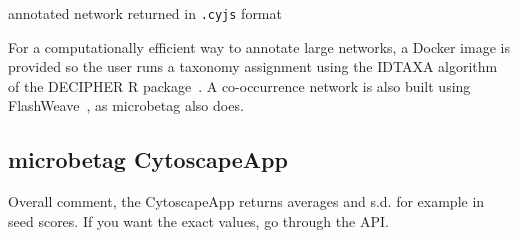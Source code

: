 \documentclass[sn-mathphys,Numbered]{sn-jnl}%
\theoremstyle{thmstyleone}%
\theoremstyle{thmstyletwo}%
\theoremstyle{thmstylethree}%
\begin{document}
        annotated network returned in \texttt{.cyjs} format


        For a computationally efficient way to annotate large networks, a Docker image is provided so the user runs a taxonomy assignment using the IDTAXA algorithm~\cite{murali2018idtaxa} of the DECIPHER R package~\cite{wright2016using}.
        A co-occurrence network is also built using FlashWeave~\cite{flashweave_cite}, as microbetag also does. 
            

        

    \subsection*{microbetag CytoscapeApp}
        \label{subsec:cytoapp}

    Overall comment, the CytoscapeApp returns averages and s.d. for example in seed scores. 
    If you want the exact values, go through the API. 
\end{document}
